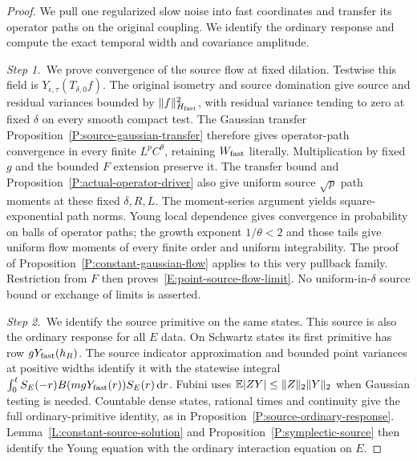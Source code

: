 \begin{proof}
  We pull one regularized slow noise into fast coordinates and transfer its
  operator paths on the original coupling. We identify the ordinary response
  and compute the exact temporal width and covariance amplitude.


  \medskip
  \noindent\textit{Step 1.~}We prove convergence of the source flow at fixed
  dilation.
  Testwise this field is $Y_{\epsilon,\tau}(T_{\delta,0}f)$. The original
  isometry and source domination give source and residual variances bounded by
  $\|f\|_{H_{\rm fast}}^2$, with residual variance tending to zero at fixed
  $\delta$ on every smooth compact test. The Gaussian transfer
  Proposition~\ref{P:source-gaussian-transfer} therefore gives operator-path
  convergence in every finite $L^pC^\theta$, retaining $W_{\rm fast}$ literally.
  Multiplication by fixed $g$ and the bounded $F$ extension preserve it. The
  transfer bound and Proposition~\ref{P:actual-operator-driver} also give
  uniform source $\sqrt p$ path moments at these fixed $\delta,R,L$. The
  moment-series argument yields square-exponential path norms. Young local
  dependence gives convergence in probability on balls of operator paths; the
  growth exponent $1/\theta < 2$ and those tails give uniform flow moments of
  every finite order and uniform integrability. The proof of
  Proposition~\ref{P:constant-gaussian-flow} applies to this very pullback
  family. Restriction from $F$ then proves~\eqref{E:point-source-flow-limit}. No
  uniform-in-$\delta$ source bound or exchange of limits is asserted.


  \medskip
  \noindent\textit{Step 2.~}We identify the source primitive on the same
  states.
  This source is also the ordinary response for all $E$ data. On Schwartz states
  its first primitive has row $gY_{\rm fast}(h_R)$. The source indicator
  approximation and bounded point variances at positive widths identify it with
  the statewise integral $\int_0^t S_E(-r)B(mgY_{\rm fast}(r))S_E(r)\,\mathrm{d} r$.
  Fubini uses $\mathbb{E}|ZY| \le \|Z\|_2\|Y\|_2$ when Gaussian testing is needed.
  Countable dense states, rational times and continuity give the full
  ordinary-primitive identity, as in
  Proposition~\ref{P:source-ordinary-response}.
  Lemma~\ref{L:constant-source-solution} and
  Proposition~\ref{P:symplectic-source} then identify the Young equation with
  the ordinary interaction equation on $E$.



\end{proof}
